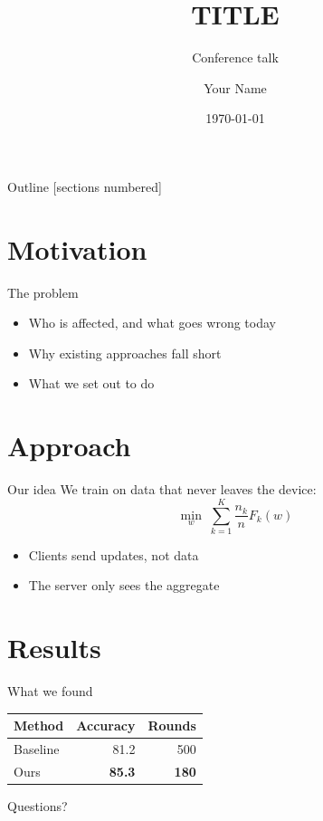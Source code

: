 \documentclass[10pt,aspectratio=169]{beamer}
\title{{{TITLE}}}
\subtitle{Conference talk}
\author{Your Name}
\institute{University One}
\date{\today}
\begin{document}
\maketitle

\begin{frame}{Outline}
  [sections numbered]
  \tableofcontents[hideallsubsections]
\end{frame}

\section{Motivation}

\begin{frame}{The problem}
  \begin{itemize}
    \item Who is affected, and what goes wrong today
    \item Why existing approaches fall short
    \item What we set out to do
  \end{itemize}
\end{frame}

\section{Approach}

\begin{frame}{Our idea}
  We train on data that never leaves the device:
  \[
    \min_{w} \; \sum_{k=1}^{K} \frac{n_k}{n} F_k(w)
  \]
  \begin{itemize}
    \item Clients send updates, not data
    \item The server only sees the aggregate
  \end{itemize}
\end{frame}

\section{Results}

\begin{frame}{What we found}
  \centering
  \begin{tabular}{lrr}
    \toprule
    Method & Accuracy & Rounds \\
    \midrule
    Baseline & 81.2 & 500 \\
    Ours & \textbf{85.3} & \textbf{180} \\
    \bottomrule
  \end{tabular}
\end{frame}

\begin{frame}[standout]
  Questions?
\end{frame}
\end{document}
